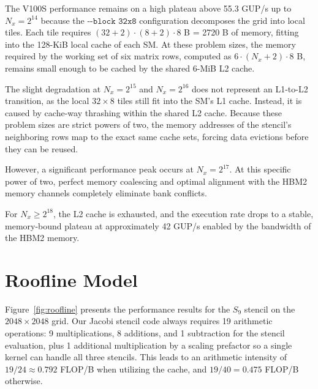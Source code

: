 The V100S performance remains on a high plateau above 55.3 GUP/s up to $N_x = 2^{14}$ because the $\texttt{-{-}block 32x8}$ configuration decomposes the grid into local tiles. 
Each tile requires $(32 + 2) \cdot (8 + 2) \cdot 8$ B = 2720 B of memory, fitting into the 128-KiB local cache of each SM. 
At these problem sizes, the memory required by the working set of six matrix rows, computed as $6 \cdot (N_x + 2) \cdot 8$ B, remains small enough to be cached by the shared 6-MiB L2 cache.

The slight degradation at $N_x = 2^{15}$ and $N_x = 2^{16}$ does not represent an L1-to-L2 transition, as the local $32 \times 8$ tiles still fit into the SM's L1 cache. 
Instead, it is caused by cache-way thrashing within the shared L2 cache. 
Because these problem sizes are strict powers of two, the memory addresses of the stencil's neighboring rows map to the exact same cache sets, forcing data evictions before they can be reused. 

However, a significant performance peak occurs at $N_x = 2^{17}$. 
At this specific power of two, perfect memory coalescing and optimal alignment with the HBM2 memory channels completely eliminate bank conflicts. 

For $N_x \geq 2^{18}$, the L2 cache is exhausted, and the execution rate drops to a stable, memory-bound plateau at approximately 42 GUP/s enabled by the bandwidth of the HBM2 memory.


\section{Roofline Model}
Figure~\ref{fig:roofline} presents the performance results for the $S_9$ stencil on the $2048 \times 2048$ grid. 
Our Jacobi stencil code always requires 19 arithmetic operations: 9 multiplications, 8 additions, and 1 subtraction for the stencil evaluation, plus 1 additional multiplication by a scaling prefactor so a single kernel can handle all three stencils. 
This leads to an arithmetic intensity of $19/24 \approx 0.792$ FLOP/B when utilizing the cache, and $19/40 = 0.475$ FLOP/B otherwise. 

